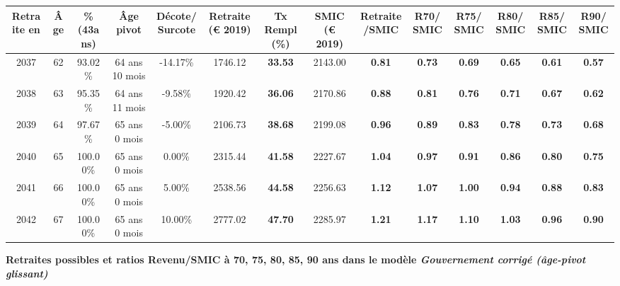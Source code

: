 \begin{adjustbox}{max width=\textwidth} 
\begin{tabular}[htb]{|c|c||c|c|c||c|c||c|c||c|c|c|c|c|} 
\hline 
 Retraite en &  Âge &  \%(43ans) &  Âge pivot &  Décote/Surcote &  Retraite (\euro{} 2019) &  Tx Rempl(\%) &  SMIC (\euro{} 2019) &  Retraite/SMIC &  R70/SMIC &  R75/SMIC &  R80/SMIC &  R85/SMIC &  R90/SMIC \\ 
\hline \hline 
 2037 &  62 &  93.02\% &  64 ans 10 mois &  -14.17\% &  1746.12 &  {\bf 33.53} &  2143.00 &  {\bf {\color{red} 0.81}} &  {\bf {\color{red} 0.73}} &  {\bf {\color{red} 0.69}} &  {\bf {\color{red} 0.65}} &  {\bf {\color{red} 0.61}} &  {\bf {\color{red} 0.57}} \\ 
\hline 
 2038 &  63 &  95.35\% &  64 ans 11 mois &  -9.58\% &  1920.42 &  {\bf 36.06} &  2170.86 &  {\bf {\color{red} 0.88}} &  {\bf {\color{red} 0.81}} &  {\bf {\color{red} 0.76}} &  {\bf {\color{red} 0.71}} &  {\bf {\color{red} 0.67}} &  {\bf {\color{red} 0.62}} \\ 
\hline 
 2039 &  64 &  97.67\% &  65 ans 0 mois &  -5.00\% &  2106.73 &  {\bf 38.68} &  2199.08 &  {\bf {\color{red} 0.96}} &  {\bf {\color{red} 0.89}} &  {\bf {\color{red} 0.83}} &  {\bf {\color{red} 0.78}} &  {\bf {\color{red} 0.73}} &  {\bf {\color{red} 0.68}} \\ 
\hline 
 2040 &  65 &  100.00\% &  65 ans 0 mois &  0.00\% &  2315.44 &  {\bf 41.58} &  2227.67 &  {\bf 1.04} &  {\bf {\color{red} 0.97}} &  {\bf {\color{red} 0.91}} &  {\bf {\color{red} 0.86}} &  {\bf {\color{red} 0.80}} &  {\bf {\color{red} 0.75}} \\ 
\hline 
 2041 &  66 &  100.00\% &  65 ans 0 mois &  5.00\% &  2538.56 &  {\bf 44.58} &  2256.63 &  {\bf 1.12} &  {\bf 1.07} &  {\bf 1.00} &  {\bf {\color{red} 0.94}} &  {\bf {\color{red} 0.88}} &  {\bf {\color{red} 0.83}} \\ 
\hline 
 2042 &  67 &  100.00\% &  65 ans 0 mois &  10.00\% &  2777.02 &  {\bf 47.70} &  2285.97 &  {\bf 1.21} &  {\bf 1.17} &  {\bf 1.10} &  {\bf 1.03} &  {\bf {\color{red} 0.96}} &  {\bf {\color{red} 0.90}} \\ 
\hline 
\hline 
\end{tabular} 
\end{adjustbox} 
 
 \vspace{0.1cm} 
{\bf \noindent Retraites possibles et ratios Revenu/SMIC à 70, 75, 80, 85, 90 ans dans le modèle \emph{Gouvernement corrigé (âge-pivot glissant)}}  
 
